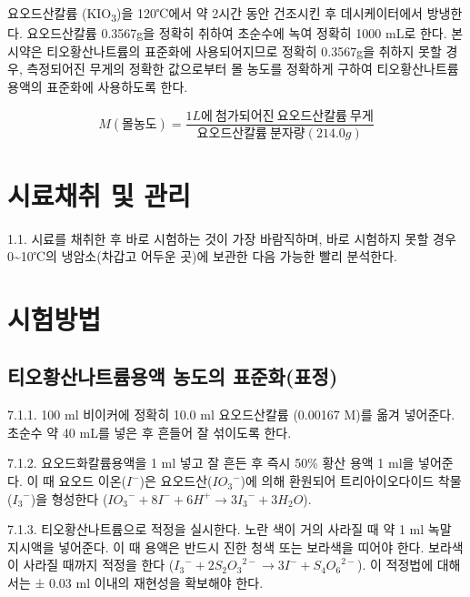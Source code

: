 \documentclass[
]{book}
\begin{document}
요오드산칼륨 (KIO\textsubscript{3})을 120℃에서 약 2시간 동안 건조시킨 후 데시케이터에서 방냉한다. 요오드산칼륨 0.3567g을 정확히 취하여 초순수에 녹여 정확히 1000 mL로 한다. 본 시약은 티오황산나트륨의 표준화에 사용되어지므로 정확히 0.3567g을 취하지 못할 경우, 측정되어진 무게의 정확한 값으로부터 몰 농도를 정확하게 구하여 티오황산나트륨 용액의 표준화에 사용하도록 한다.

\[M(몰농도)= \frac{1L에 ~ 첨가되어진 ~ 요오드산 칼륨 ~ 무게}{요오드산 칼륨 ~ 분자량 (214.0g)}\]

\hypertarget{uxc2dcuxb8ccuxcc44uxcde8-uxbc0f-uxad00uxb9ac}{%
\section{시료채취 및 관리}\label{uxc2dcuxb8ccuxcc44uxcde8-uxbc0f-uxad00uxb9ac}}

1.1. 시료를 채취한 후 바로 시험하는 것이 가장 바람직하며, 바로 시험하지 못할 경우 0\textasciitilde10℃의 냉암소(차갑고 어두운 곳)에 보관한 다음 가능한 빨리 분석한다.

\hypertarget{uxc2dcuxd5d8uxbc29uxbc95}{%
\section{시험방법}\label{uxc2dcuxd5d8uxbc29uxbc95}}

\hypertarget{uxd2f0uxc624uxd669uxc0b0uxb098uxd2b8uxb968uxc6a9uxc561-uxb18duxb3c4uxc758-uxd45cuxc900uxd654uxd45cuxc815}{%
\subsection{티오황산나트륨용액 농도의 표준화(표정)}\label{uxd2f0uxc624uxd669uxc0b0uxb098uxd2b8uxb968uxc6a9uxc561-uxb18duxb3c4uxc758-uxd45cuxc900uxd654uxd45cuxc815}}

7.1.1. 100 ml 비이커에 정확히 10.0 ml 요오드산칼륨 (0.00167 M)를 옮겨 넣어준다. 초순수 약 40 mL를 넣은 후 흔들어 잘 섞이도록 한다.

7.1.2. 요오드화칼륨용액을 1 ml 넣고 잘 흔든 후 즉시 50\% 황산 용액 1 ml을 넣어준다. 이 때 요오드 이온(\(I^{-}\))은 요오드산(\({IO_{3}}^{-}\))에 의해 환원되어 트리아이오다이드 착물(\({I_{3}}^{-}\))을 형성한다 (\({IO_{3}}^{-} + 8I^{-} + 6H^{+} → 3{I_{3}}^{-} + 3H_{2}O\)).

7.1.3. 티오황산나트륨으로 적정을 실시한다. 노란 색이 거의 사라질 때 약 1 ml 녹말 지시액을 넣어준다. 이 때 용액은 반드시 진한 청색 또는 보라색을 띠어야 한다. 보라색이 사라질 때까지 적정을 한다 (\({I_{3}}^{-} + 2{S_{2}O_{3}}^{2-} → 3I^{-} + {S_{4}O_{6}}^{2-}\)). 이 적정법에 대해서는 ± 0.03 ml 이내의 재현성을 확보해야 한다.
\end{document}
